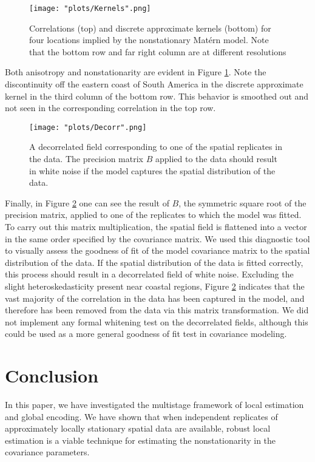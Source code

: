 \documentclass[review]{elsarticle}
\begin{document}
\begin{figure}
    \centering
    \texttt{[image: "plots/Kernels".png]} %
    \caption{Correlations (top) and discrete approximate kernels (bottom) for four locations implied by the nonstationary Mat\'ern model. Note that the bottom row and far right column are at different resolutions}
    \label{f:5}
\end{figure}

Both anisotropy and nonstationarity are evident in Figure \ref{f:5}. Note the discontinuity off the eastern coast of South America in the discrete approximate kernel in the third column of the bottom row. This behavior is smoothed out and not seen in the corresponding correlation in the top row.


\begin{figure}
    \centering
    \texttt{[image: "plots/Decorr".png]} %
    \caption{A decorrelated field corresponding to one of the spatial replicates in the data. The precision matrix $B$ applied to the data should result in white noise if the model captures the spatial distribution of the data.}
    \label{f:6}
\end{figure}

Finally, in Figure \ref{f:6} one can see the result of $B$, the symmetric square root of the precision matrix, applied to one of the replicates to which the model was fitted. To carry out this matrix multiplication, the spatial field is flattened into a vector in the same order specified by the covariance matrix. We used this diagnostic tool to visually assess the goodness of fit of the model covariance matrix to the spatial distribution of the data. If the spatial distribution of the data is fitted correctly, this process should result in a decorrelated field of white noise. Excluding the slight heteroskedasticity present near coastal regions, Figure \ref{f:6} indicates that the vast majority of the correlation in the data has been captured in the model, and therefore has been removed from the data via this matrix transformation. We did not implement any formal whitening test on the decorrelated fields, although this could be used as a more general goodness of fit test in covariance modeling.


\section{Conclusion}

In this paper, we have investigated the multistage framework of local estimation and global encoding. We have shown that when independent replicates of approximately locally stationary spatial data are available, robust local estimation is a viable technique for estimating the nonstationarity in the covariance parameters.
\end{document}
